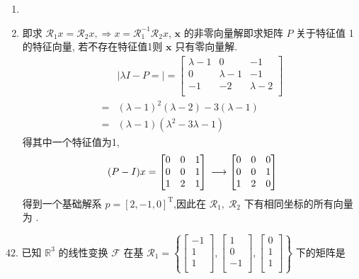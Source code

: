 \begin{enumerate}[(1)]
    \item {}
    
    \item 即求 $\mathscr{R}_1x=\mathscr{R}_2x,\Longrightarrow x= \mathscr{R}_1^{-1}\mathscr{R}_2x$, $\textbf{x}$ 的非零向量解即求矩阵 $P$ 关于特征值 1的特征向量, 若不存在特征值1则 $\textbf{x}$ 只有零向量解.  
    $$
    \begin{aligned}
        &|\lambda I-P=|=\begin{bmatrix}
        \lambda-1&0&-1\\
        0&\lambda-1&-1\\
        -1&-2&\lambda-2\\
        \end{bmatrix}\\
        =&(\lambda-1)^2
        (\lambda-2)-3(\lambda-1)\\
        =&(\lambda-1)(\lambda^2-3\lambda-1)
    \end{aligned}
    $$
    得其中一个特征值为1, 
    $$
    (P-I)x=\begin{bmatrix}
        0&0&1\\
        0&0&1\\
        1&2&1\\
    \end{bmatrix}\\
    \longrightarrow\begin{bmatrix}
        0&0&0\\0&0&1\\1&2&0
    \end{bmatrix}
    $$
    得到一个基础解系 $p=[2,-1,0]^{\text{T}}$,因此在 $\mathscr{R}_1,\;\mathscr{R}_2$ 下有相同坐标的所有向量为 .

\end{enumerate}



\vspace{12pt}

42. 已知 $\mathbb{R}^3$ 的线性变换 $\mathscr{F}$ 在基 $\mathscr{R}_1=\left\{
    \begin{bmatrix}
        -1\\1\\1\\
    \end{bmatrix},
    \begin{bmatrix}
        1\\0\\-1\\
    \end{bmatrix},
    \begin{bmatrix}
        0\\1\\1\\
    \end{bmatrix}
\right\}$ 下的矩阵是

